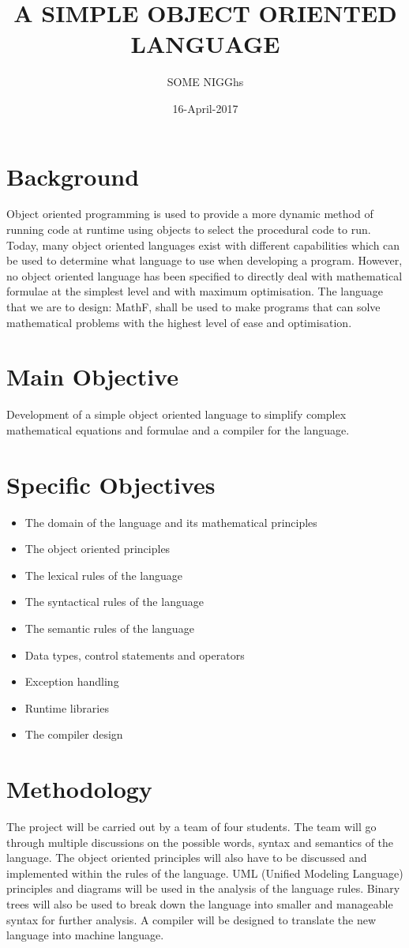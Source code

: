 \documentclass{article}
\begin{document}
\title{A SIMPLE OBJECT ORIENTED LANGUAGE}
\date{16-April-2017}
\author{SOME NIGGhs}

\maketitle
\newpage

\section{Background}
Object oriented programming is used to provide a more dynamic method of running code at runtime using objects to select the procedural code to run. Today, many object oriented languages exist with different capabilities which can be used to determine what language to use when developing a program. However, no object oriented language has been specified to directly deal with mathematical formulae at the simplest level and with maximum optimisation. The language that we are to design: MathF, shall be used to make programs that can solve mathematical problems with the highest level of ease and optimisation.

\section{Main Objective}
Development of a simple object oriented language to simplify complex mathematical equations and formulae and a compiler for the language.

\section{Specific Objectives}
\begin{itemize}
\item
The domain of the language and its mathematical principles
\item
The object oriented principles
\item
The lexical rules of the language
\item
The syntactical rules of the language
\item
The semantic rules of the language
\item
Data types, control statements and operators
\item
Exception handling
\item
Runtime libraries
\item
The compiler design
\end{itemize}

\section{Methodology}
The project will be carried out by a team of four students. The team will go through multiple discussions on the possible words, syntax and semantics of the language. The object oriented principles will also have to be discussed and implemented within the rules of the language. UML (Unified Modeling Language) principles and diagrams will be used in the analysis of the language rules. Binary trees will also be used to break down the language into smaller and manageable syntax for further analysis. A compiler will be designed to translate the new language into machine language.
\end{document}
